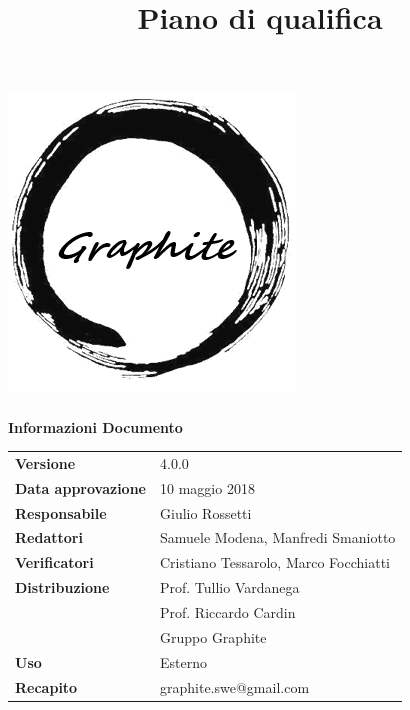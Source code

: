 \documentclass[openany,12pt,a4paper]{report}
\title{Piano di qualifica}
\author{}
\newcommand{\versione}{4.0.0}
\begin{document}
	\makeatletter
	\begin{titlepage}
		\setlength{\headsep}{0pt}  
		\begin{center}
			\includegraphics[width=0.5\linewidth]{img/logo.png}\\[1em]
			{\huge \bfseries  \@title }\\[10ex]
			\textbf{\Large Informazioni Documento} \\[2em]
			\bgroup
			\def\arraystretch{1.5}
			\begin{tabular}{l|l}
				\textbf{Versione} & \versione{} \\
				\textbf{Data approvazione} & 10 maggio 2018 \\
				\textbf{Responsabile} & Giulio Rossetti\\
				\textbf{Redattori} &  Samuele Modena, Manfredi Smaniotto\\
				\textbf{Verificatori} & Cristiano Tessarolo, Marco Focchiatti \\
				\textbf{Distribuzione} & Prof. Tullio Vardanega \\
				 & Prof. Riccardo Cardin \\
				 & Gruppo Graphite \\
				\textbf{Uso} & Esterno \\
				\textbf{Recapito} & graphite.swe@gmail.com \\
			\end{tabular}
		\egroup
		\end{center}
	\end{titlepage}
	\makeatother
 
\thispagestyle{empty}
\newpage

\end{document}
